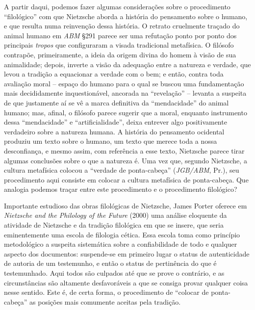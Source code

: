 \documentclass[
	12pt,				%
	openright,			%
	oneside,			%
	a4paper,			%
	english,			%
	french,				%
	spanish,			%
	brazil				%
	]{abntex2}
\begin{document}
A partir daqui, podemos fazer algumas considerações sobre o procedimento “filológico” com que Nietzsche aborda a história do pensamento sobre o humano, e que resulta numa reinvenção dessa história. O retrato cruelmente traçado do animal humano em \textit{ABM} §291 parece ser uma refutação ponto por ponto dos principais \textit{tropos} que configuraram a visada tradicional metafísica. O filósofo contrapõe, primeiramente, a ideia da origem divina do homem à visão de sua animalidade; depois, inverte a visão da adequação entre a natureza e verdade, que levou a tradição a equacionar a verdade com o bem; e então, contra toda avaliação moral – espaço do humano para o qual se buscou uma fundamentação mais decididamente inquestionável, ancorada na “revelação” – levanta a suspeita de que justamente aí se vê a marca definitiva da “mendacidade” do animal humano; mas, afinal, o filósofo parece sugerir que a moral, enquanto instrumento dessa “mendacidade” e “artificialidade”, deixa entrever algo positivamente verdadeiro sobre a natureza humana. A história do pensamento ocidental produziu um texto sobre o humano, um texto que merece toda a nossa desconfiança, e mesmo assim, com referência a esse texto, Nietzsche parece tirar algumas conclusões sobre o que a natureza é. Uma vez que, segundo Nietzsche, a cultura metafísica colocou a “verdade de ponta-cabeça” (\textit{JGB/ABM}, Pr.), seu procedimento aqui consiste em colocar a cultura metafísica de ponta-cabeça. Que analogia podemos traçar entre este procedimento e o procedimento filológico?

Importante estudioso das obras filológicas de Nietzsche, James Porter oferece em \textit{Nietzsche and the Philology of the Future} (2000) uma análise eloquente da atividade de Nietzsche  e da tradição filológica em que se insere, que seria eminentemente uma escola de filologia cética. Essa escola toma como princípio metodológico a suspeita sistemática sobre a confiabilidade de todo e qualquer aspecto dos documentos: suspende-se em primeiro lugar o status de autenticidade de autoria de um testemunho, e então o status de pertinência do que é testemunhado. Aqui todos são culpados até que se prove o contrário, e as circunstâncias são altamente desfavoráveis a que se consiga provar qualquer coisa nesse sentido. Este é, de certa forma, o procedimento de “colocar de ponta-cabeça” as posições mais comumente aceitas pela tradição.
\end{document}
